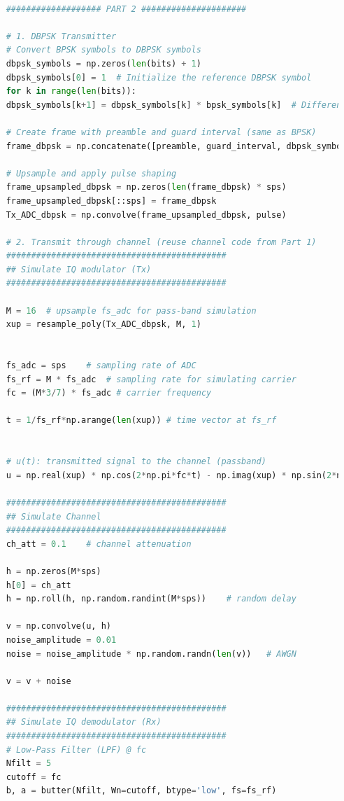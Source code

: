 \documentclass[
	letterpaper, %
	10pt, %
]{CSUniSchoolLabReport}
\begin{document}
\begin{lstlisting}[language=Python]
	
	################### PART 2 #####################
	
	# 1. DBPSK Transmitter
	# Convert BPSK symbols to DBPSK symbols
	dbpsk_symbols = np.zeros(len(bits) + 1)
	dbpsk_symbols[0] = 1  # Initialize the reference DBPSK symbol
	for k in range(len(bits)):
	dbpsk_symbols[k+1] = dbpsk_symbols[k] * bpsk_symbols[k]  # Differential encoding
	
	# Create frame with preamble and guard interval (same as BPSK)
	frame_dbpsk = np.concatenate([preamble, guard_interval, dbpsk_symbols])  # Skip reference symbol
	
	# Upsample and apply pulse shaping
	frame_upsampled_dbpsk = np.zeros(len(frame_dbpsk) * sps)
	frame_upsampled_dbpsk[::sps] = frame_dbpsk
	Tx_ADC_dbpsk = np.convolve(frame_upsampled_dbpsk, pulse)
	
	# 2. Transmit through channel (reuse channel code from Part 1)
	############################################
	## Simulate IQ modulator (Tx)
	############################################
	
	M = 16  # upsample fs_adc for pass-band simulation
	xup = resample_poly(Tx_ADC_dbpsk, M, 1)
	
	
	fs_adc = sps    # sampling rate of ADC
	fs_rf = M * fs_adc  # sampling rate for simulating carrier
	fc = (M*3/7) * fs_adc # carrier frequency
	
	t = 1/fs_rf*np.arange(len(xup)) # time vector at fs_rf
	
	
	# u(t): transmitted signal to the channel (passband)
	u = np.real(xup) * np.cos(2*np.pi*fc*t) - np.imag(xup) * np.sin(2*np.pi*fc*t)
	
	############################################
	## Simulate Channel
	############################################
	ch_att = 0.1    # channel attenuation
	
	h = np.zeros(M*sps)
	h[0] = ch_att
	h = np.roll(h, np.random.randint(M*sps))    # random delay
	
	v = np.convolve(u, h) 
	noise_amplitude = 0.01
	noise = noise_amplitude * np.random.randn(len(v))   # AWGN
	
	v = v + noise
	
	############################################
	## Simulate IQ demodulator (Rx)
	############################################
	# Low-Pass Filter (LPF) @ fc
	Nfilt = 5
	cutoff = fc
	b, a = butter(Nfilt, Wn=cutoff, btype='low', fs=fs_rf)
	

\end{lstlisting}
\end{document}
